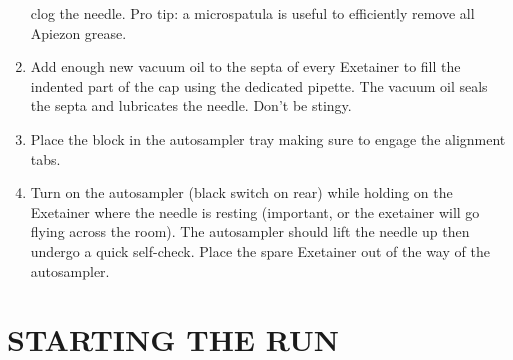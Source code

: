 \documentclass[]{article}
\begin{document}
\begin{enumerate}
  clog the needle. Pro tip: a microspatula is useful to efficiently
  remove all Apiezon grease.\\
\item
  Add enough new vacuum oil to the septa of every Exetainer to fill the
  indented part of the cap using the dedicated pipette. The vacuum oil
  seals the septa and lubricates the needle. Don't be stingy.\\
\item
  Place the block in the autosampler tray making sure to engage the
  alignment tabs.\\
\item
  Turn on the autosampler (black switch on rear) while holding on the
  Exetainer where the needle is resting (important, or the exetainer
  will go flying across the room). The autosampler should lift the
  needle up then undergo a quick self-check. Place the spare Exetainer
  out of the way of the autosampler.
\end{enumerate}

\section{STARTING THE RUN}\label{starting-the-run}
\end{document}

